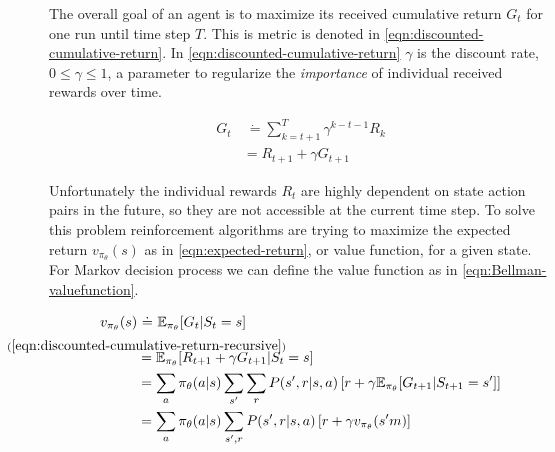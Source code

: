 

The overall goal of an agent is to maximize its received cumulative return $G_t$ for one run until time step $T$. This is metric is denoted in \eqref{eqn:discounted-cumulative-return}. In \eqref{eqn:discounted-cumulative-return} $\gamma$ is the discount rate, $0 \leq \gamma \leq 1$, a parameter to regularize the \textit{importance} of individual received rewards over time. 


\begin{align}
	G_t & \ \dot{=} \sum_{k=t+1}^T \gamma^{k-t-1}R_k \label{eqn:discounted-cumulative-return} \\
	&= R_{t+1} + \gamma G_{t+1} \label{eqn:discounted-cumulative-return-recursive}
\end{align}

Unfortunately the individual rewards $R_t$ are highly dependent on state action pairs in the future, so they are not accessible at the current time step. To solve this problem reinforcement algorithms are trying to maximize the expected return $v_{\pi_\theta}(s)$ as in \eqref{eqn:expected-return}, or value function, for a given state. For Markov decision process we can define the value function as in \eqref{eqn:Bellman-valuefunction}. 


\begin{align}
	v_{\pi_\theta}(s) & \ \dot{=} \ \mathbb{E}_{\pi_\theta}[G_t | S_t = s] \label{eqn:expected-return} \\
	&\overset{\mathclap{\strut(\ref{eqn:discounted-cumulative-return-recursive})}}{=} \mathbb{E}_{\pi_\theta}[R_{t+1} + \gamma G_{t+1}| S_t = s] \nonumber \\
	& = \sum_a \pi_\theta(a|s) \sum_{s'} \sum_r P(s', r| s, a)\left[r + \gamma \mathbb{E}_{\pi_\theta}[G_{t+1} | S_{t+1} = s']\right] \nonumber \\
	& = \sum_a \pi_\theta(a|s) \sum_{s', r} P(s', r| s, a)\left[r + \gamma v_{\pi_\theta}(s'm)\right] \label{eqn:Bellman-valuefunction}
\end{align}

